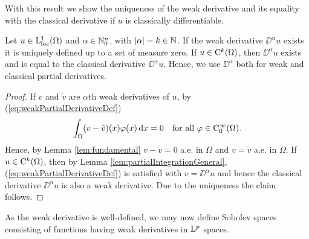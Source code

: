 With this result we show the uniqueness of the weak derivative and its equality with the classical derivative if $u$ is classically differentiable.

\begin{lem}
  Let $u \in \mathrm{L}_{\operatorname{loc}}^1(\Omega)$ and $\alpha \in \mathbb{N}_0^n$, with $|\alpha| = k \in \mathbb{N}$. 
  If the weak derivative $\DD^\alpha u$ exists it is uniquely defined up to a set of measure zero.
  If $u \in \mathrm{C}^k(\Omega)$, then $\DD^\alpha u$ exists and is equal to the classical derivative $\DD^\alpha u$. 
  Hence, we use $\DD^\alpha$ both for weak and classical partial derivatives.
\end{lem}

\begin{proof}
  If $v$ and $\tilde v$ are $\alpha$th weak derivatives of $u$, by (\ref{eq:weakPartialDerivativeDef})
  $$
  \int_\Omega (v - \tilde v) (x) \varphi(x) \, {\operatorname{d}\!{x}} = 0 \quad\text{for all } \varphi \in \mathrm{C}_0^\infty(\Omega).
  $$
  Hence, by Lemma \ref{lem:fundamental} $v - \tilde v = 0$ a.e. in $\Omega$ and $v = \tilde v$ a.e. in $\Omega$.
  If $u \in \mathrm{C}^k(\Omega)$, then by Lemma \ref{lem:partialIntegrationGeneral}, (\ref{eq:weakPartialDerivativeDef}) is satisfied with $v = \DD^\alpha u$ and hence the classical derivative $\DD^\alpha u$ is also a weak derivative.
  Due to the uniqueness the claim follows.
\end{proof}

As the weak derivative is well-defined, we may now define Sobolev spaces consisting of functions having weak derivatives in $\mathrm{L}^p$ spaces.

